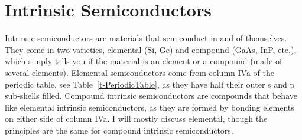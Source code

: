 



\section{Intrinsic Semiconductors}

Intrinsic semiconductors are materials that semiconduct in and of themselves.  They come in two varieties, elemental (Si, Ge) and compound (GaAs, InP, etc.), which simply tells you if the material is an element or a compound (made of several elements).  Elemental semiconductors come from column IVa of the periodic table, see Table~\ref{t-PeriodicTable}, as they have half their outer s and p sub-shells filled.  Compound intrinsic semiconductors are compounds that behave like elemental intrinsic semiconductors, as they are formed by bonding elements on either side of column IVa.  I will mostly discuss elemental, though the principles are the same for compound intrinsic semiconductors.

